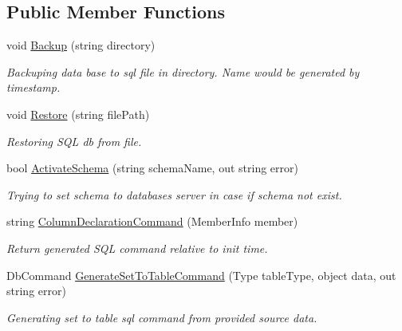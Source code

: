 \subsection*{Public Member Functions}
\begin{DoxyCompactItemize}
\item 
void \mbox{\hyperlink{class_uniform_data_operator_1_1_sql_1_1_my_sql_1_1_my_sql_data_operator_a0dbd58206733a17dd26143b58d0859d7}{Backup}} (string directory)
\begin{DoxyCompactList}\small\item\em Backuping data base to sql file in directory. Name would be generated by timestamp. \end{DoxyCompactList}\item 
void \mbox{\hyperlink{class_uniform_data_operator_1_1_sql_1_1_my_sql_1_1_my_sql_data_operator_a22a9e92989ebdb3a52b8ebe409c59831}{Restore}} (string file\+Path)
\begin{DoxyCompactList}\small\item\em Restoring S\+QL db from file. \end{DoxyCompactList}\item 
bool \mbox{\hyperlink{class_uniform_data_operator_1_1_sql_1_1_my_sql_1_1_my_sql_data_operator_a2ed7d06bc016ae6d07cbcceffc21bbd3}{Activate\+Schema}} (string schema\+Name, out string error)
\begin{DoxyCompactList}\small\item\em Trying to set schema to databases server in case if schema not exist. \end{DoxyCompactList}\item 
string \mbox{\hyperlink{class_uniform_data_operator_1_1_sql_1_1_my_sql_1_1_my_sql_data_operator_a0bdc2943e5d10576fb564913cdd744e7}{Column\+Declaration\+Command}} (Member\+Info member)
\begin{DoxyCompactList}\small\item\em Return generated S\+QL command relative to init time. \end{DoxyCompactList}\item 
Db\+Command \mbox{\hyperlink{class_uniform_data_operator_1_1_sql_1_1_my_sql_1_1_my_sql_data_operator_ac3af074cabe5721a685f0650dc69a871}{Generate\+Set\+To\+Table\+Command}} (Type table\+Type, object data, out string error)
\begin{DoxyCompactList}\small\item\em Generating set to table sql command from provided source data. \end{DoxyCompactList}\item 

\end{DoxyCompactItemize}
